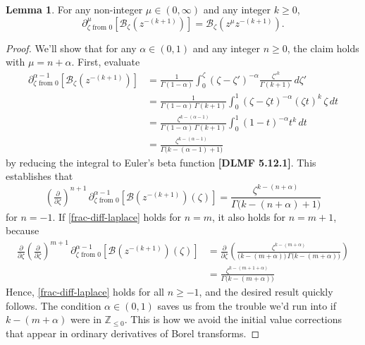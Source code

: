 \documentclass{article}
\theoremstyle{definition}
\newcommand{\Z}{\mathbb{Z}}
\newcommand{\borel}{\mathcal{B}}
\newtheorem{lemma}[definition]{Lemma}
\begin{document}
\begin{lemma}\label{lem:frac-deriv-Borel}
For any non-integer $\mu \in (0, \infty)$ and any integer $k \ge 0$,
\[ \partial^\mu_{\zeta \text{ from } 0} \left[ \borel_\zeta \left(z^{-(k+1)}\right) \right] =  \borel_\zeta \left(z^\mu z^{-(k+1)}\right). \]
\end{lemma}
\begin{proof}
We'll show that for any $\alpha \in (0, 1)$ and any integer $n \ge 0$, the claim holds with $\mu = n + \alpha$. First, evaluate
\begin{align*}
\partial^{\alpha-1}_{\zeta \text{ from } 0} \left[ \borel_\zeta \left(z^{-(k+1)}\right) \right] & = \frac{1}{\Gamma(1-\alpha)} \int_0^\zeta (\zeta-\zeta')^{-\alpha} \frac{{\zeta'}^k}{\Gamma(k+1)}\,d\zeta' \\
& = \frac{1}{\Gamma(1-\alpha)\,\Gamma(k+1)} \int_0^1 (\zeta-\zeta t)^{-\alpha} (\zeta t)^k\,\zeta\,dt \\
& = \frac{\zeta^{k-(\alpha-1)}}{\Gamma(1-\alpha)\,\Gamma(k+1)} \int_0^1 (1-t)^{-\alpha} t^k\,dt \\
& = \frac{\zeta^{k-(\alpha-1)}}{\Gamma\big(k-(\alpha-1)+1\big)}
\end{align*}
by reducing the integral to Euler's beta function \textbf{[DLMF 5.12.1]}. This establishes that
\begin{equation}\label{frac-diff-laplace}
\left(\tfrac{\partial}{\partial \zeta}\right)^{n+1}\,\partial^{\alpha-1}_{\zeta \text{ from } 0} \left[ \borel \left(z^{-(k+1)}\right)(\zeta) \right] = \frac{\zeta^{k-(n+\alpha)}}{\Gamma\big(k-(n+\alpha)+1\big)}
\end{equation}
for $n = -1$. If \eqref{frac-diff-laplace} holds for $n = m$, it also holds for $n = m+1$, because
\begin{align*}
\tfrac{\partial}{\partial \zeta} \left(\tfrac{\partial}{\partial \zeta}\right)^{m+1}\,\partial^{\alpha-1}_{\zeta \text{ from } 0} \left[ \borel \left(z^{-(k+1)}\right)(\zeta) \right] & = \tfrac{\partial}{\partial \zeta} \left( \frac{\zeta^{k-(m+\alpha)}}{\big(k-(m+\alpha)\big)\,\Gamma\big(k-(m+\alpha)\big)} \right) \\
& = \frac{\zeta^{k-(m+1+\alpha)}}{\Gamma\big(k-(m+\alpha)\big)}
\end{align*}
Hence, \eqref{frac-diff-laplace} holds for all $n \ge -1$, and the desired result quickly follows. The condition $\alpha \in (0, 1)$ saves us from the trouble we'd run into if $k-(m+\alpha)$ were in $\Z_{\le 0}$. This is how we avoid the initial value corrections that appear in ordinary derivatives of Borel transforms.
\end{proof}
\end{document}
